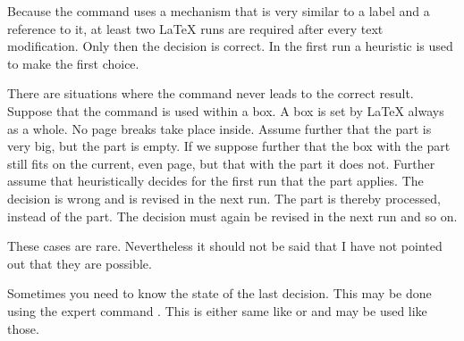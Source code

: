 Because the  command uses a mechanism that is
very similar to a label and a reference to it, at least two \LaTeX{}
runs are required after every text modification. Only then the
decision is correct. In the first run a heuristic is used to make the
first choice.


\begin{Explain}
  There are situations where the  command never
  leads to the correct result. Suppose that the command is used within
  a box. A box is set by \LaTeX{} always as a whole. No page breaks
  take place inside. Assume further that the  part is very
  big, but the  part is empty. If we suppose further that
  the box with the  part still fits on the current, even
  page, but that with the  part it does not.  Further
  assume that \KOMAScript{} heuristically decides for the first run
  that the  part applies. The decision is wrong and is
  revised in the next run. The  part is thereby
  processed, instead of the  part. The decision must again
  be revised in the next run and so on.

  These cases are rare. Nevertheless it should not be said that I have
  not pointed out that they are possible.

  Sometimes you need to know the state of the last decision. This may be done
  using the expert command . This is either same like
   or  and may be used like those.
\end{Explain}
%
%
%

